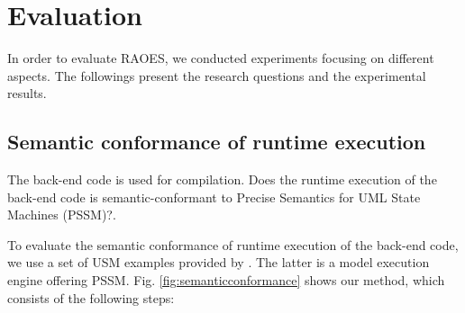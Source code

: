 \section{Evaluation}
\label{sec:exp}

In order to evaluate RAOES, we conducted experiments focusing on different aspects. 
The followings present the research questions and the experimental results. 






\subsection{Semantic conformance of runtime execution}
\label{subsec:exp1}
{} The back-end code is used for compilation. Does the runtime execution of the back-end code is semantic-conformant to Precise Semantics for UML State Machines (PSSM)?.

To evaluate the semantic conformance of runtime execution of the back-end code, we use a set of USM examples provided by  \cite{moka}. 
The latter is a model execution engine offering PSSM. 
Fig. \ref{fig:semanticconformance} shows our method, which consists of the following steps:

